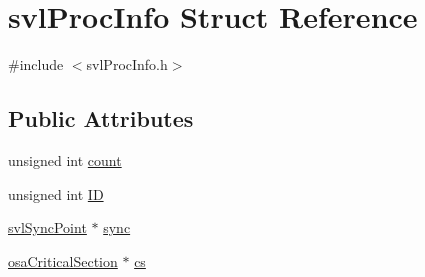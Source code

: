 \hypertarget{structsvl_proc_info}{\section{svl\-Proc\-Info Struct Reference}
\label{structsvl_proc_info}
}


{\ttfamily \#include $<$svl\-Proc\-Info.\-h$>$}

\subsection*{Public Attributes}
\begin{DoxyCompactItemize}
\item 
unsigned int \hyperlink{structsvl_proc_info_a4cced89ad8330495e631543a5e2b71ad}{count}
\item 
unsigned int \hyperlink{structsvl_proc_info_afc6f44188d8eb0d790d5355880323830}{I\-D}
\item 
\hyperlink{classsvl_sync_point}{svl\-Sync\-Point} $\ast$ \hyperlink{structsvl_proc_info_a43238972bbbf3b4d82e9a28e1c8fd410}{sync}
\item 
\hyperlink{classosa_critical_section}{osa\-Critical\-Section} $\ast$ \hyperlink{structsvl_proc_info_ac899e1383645cebefa007101ecd9b68b}{cs}
\end{DoxyCompactItemize}


